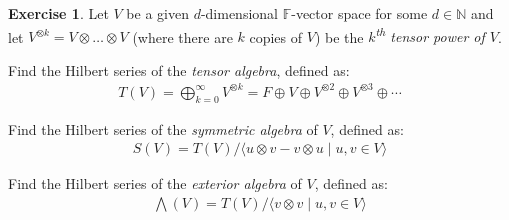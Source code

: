 \documentclass{article}
\theoremstyle{definition}
\newtheorem{Exercise}{Exercise}
\theoremstyle{remark}
\theoremstyle{underline}
\theoremstyle{underline}
\renewcommand{\th}{\textsuperscript{th}\xspace}
\begin{document}
	\begin{Exercise}
		Let $V$ be a given $d$-dimensional $\mathbb F$-vector space for some $d \in \mathbb N$ and let $V^{\otimes k} = V \otimes \dots \otimes V$ (where there are $k$ copies of $V$) be the \emph{$k$\th tensor power of $V$}.
		\begin{subquests}
			\item Find the Hilbert series of the \emph{tensor algebra}, defined as:
			\begin{gather*}
				T(V) = \bigoplus_{k=0}^{\infty} V^{\otimes k} = F \oplus V \oplus V^{\otimes 2} \oplus V^{\otimes 3} \oplus \cdots
			\end{gather*}			

			\item Find the Hilbert series of the \emph{symmetric algebra} of $V$, defined as:
			\begin{gather*}
			 	S(V) = T(V)/\langle u \otimes v - v \otimes u \mid u,v \in V \rangle
			 \end{gather*} 

			\item Find the Hilbert series of the \emph{exterior algebra} of $V$, defined as:
			\begin{gather*}
				\bigwedge(V) = T(V)/\langle v \otimes v \mid u,v \in V \rangle
			\end{gather*}
		\end{subquests}
	\end{Exercise}
\end{document}
